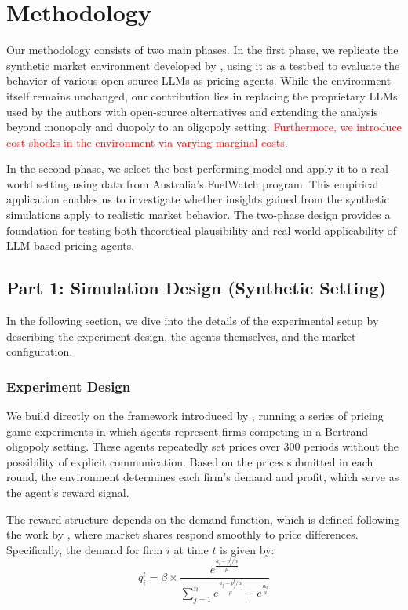 \section{Methodology}

Our methodology consists of two main phases. In the first phase, we replicate the synthetic market environment developed by \parencite{fish_algorithmic_2025}, using it as a testbed to evaluate the behavior of various open-source LLMs as pricing agents. While the environment itself remains unchanged, our contribution lies in replacing the proprietary LLMs used by the authors with open-source alternatives and extending the analysis beyond monopoly and duopoly to an oligopoly setting. \textcolor{red}{Furthermore, we introduce cost shocks in the environment via varying marginal costs}.

In the second phase, we select the best-performing model and apply it to a real-world setting using data from Australia's FuelWatch program. This empirical application enables us to investigate whether insights gained from the synthetic simulations apply to realistic market behavior. The two-phase design provides a foundation for testing both theoretical plausibility and real-world applicability of LLM-based pricing agents.


\subsection{Part 1: Simulation Design (Synthetic Setting)}

In the following section, we dive into the details of the experimental setup by describing the experiment design, the agents themselves, and the market configuration.

\subsubsection*{Experiment Design}

We build directly on the framework introduced by \cite{fish_algorithmic_2025}, running a series of pricing game experiments in which agents represent firms competing in a Bertrand oligopoly setting. These agents repeatedly set prices over 300 periods without the possibility of explicit communication. Based on the prices submitted in each round, the environment determines each firm's demand and profit, which serve as the agent’s reward signal.

The reward structure depends on the demand function, which is defined following the work by \parencite{calvano_artificial_2020}, where market shares respond smoothly to price differences. Specifically, the demand for firm \( i \) at time \( t \) is given by:
\begin{equation}
    q_i^t = \beta \times \frac{e^{\frac{a_i - p_i^t/\alpha}{\mu}}}{\sum_{j=1}^{n} e^{\frac{a_j - p_j^t/\alpha}{\mu}} + e^{\frac{a_0}{\mu}}}
\end{equation}

